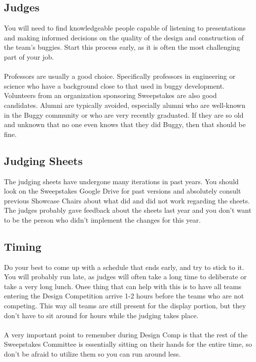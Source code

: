 \subsection{Judges}
You will need to find knowledgeable people capable of listening to
presentations and making informed decisions on the quality of the design
and construction of the team's buggies. Start this process early, as it is
often the most challenging part of your job.
\\\\
Professors are usually a good choice. Specifically professors in engineering
or science who have a background close to that used in buggy development.
Volunteers from an organization sponsoring Sweepstakes are also good
candidates. Alumni are typically avoided, especially alumni who are well-known
in the Buggy community or who are very recently graduated. If they are so
old and unknown that no one even knows that they did Buggy, then that should be
fine.

\subsection{Judging Sheets}
The judging sheets have undergone many iterations in past years. You should
look on the Sweepstakes Google Drive for past versions and absolutely
consult previous Showcase Chairs about what did and did not work regarding
the sheets. The judges probably gave feedback about the sheets last year
and you don't want to be the person who didn't implement the changes for
this year.

\subsection{Timing}
Do your best to come up with a schedule that ends early, and try to stick
to it. You will probably run late, as judges will often take a long time to
deliberate or take a very long lunch. Onee thing that can help with this
is to have all teams entering the Design Competition arrive 1-2 hours before
the teams who are not competing. This way all teams are still present for the
display portion, but they don't have to sit around for hours while the
judging takes place.
\\\\
A very important point to remember during Design Comp is that the rest of
the Sweepstakes Committee is essentially sitting on their hands for the
entire time, so don't be afraid to utilize them so you can run around less.

